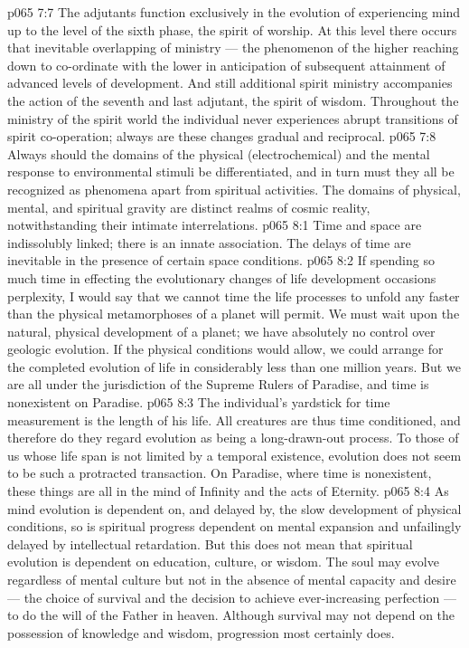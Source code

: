 \vs p065 7:7 The adjutants function exclusively in the evolution of experiencing mind up to the level of the sixth phase, the spirit of worship. At this level there occurs that inevitable overlapping of ministry --- the phenomenon of the higher reaching down to co\hyp{}ordinate with the lower in anticipation of subsequent attainment of advanced levels of development. And still additional spirit ministry accompanies the action of the seventh and last adjutant, the spirit of wisdom. Throughout the ministry of the spirit world the individual never experiences abrupt transitions of spirit co\hyp{}operation; always are these changes gradual and reciprocal.
\vs p065 7:8 Always should the domains of the physical (electrochemical) and the mental response to environmental stimuli be differentiated, and in turn must they all be recognized as phenomena apart from spiritual activities. The domains of physical, mental, and spiritual gravity are distinct realms of cosmic reality, notwithstanding their intimate interrelations.
\vs p065 8:1 Time and space are indissolubly linked; there is an innate association. The delays of time are inevitable in the presence of certain space conditions.
\vs p065 8:2 If spending so much time in effecting the evolutionary changes of life development occasions perplexity, I would say that we cannot time the life processes to unfold any faster than the physical metamorphoses of a planet will permit. We must wait upon the natural, physical development of a planet; we have absolutely no control over geologic evolution. If the physical conditions would allow, we could arrange for the completed evolution of life in considerably less than one million years. But we are all under the jurisdiction of the Supreme Rulers of Paradise, and time is nonexistent on Paradise.
\vs p065 8:3 The individual’s yardstick for time measurement is the length of his life. All creatures are thus time conditioned, and therefore do they regard evolution as being a long\hyp{}drawn\hyp{}out process. To those of us whose life span is not limited by a temporal existence, evolution does not seem to be such a protracted transaction. On Paradise, where time is nonexistent, these things are all  in the mind of Infinity and the acts of Eternity.
\vs p065 8:4 As mind evolution is dependent on, and delayed by, the slow development of physical conditions, so is spiritual progress dependent on mental expansion and unfailingly delayed by intellectual retardation. But this does not mean that spiritual evolution is dependent on education, culture, or wisdom. The soul may evolve regardless of mental culture but not in the absence of mental capacity and desire --- the choice of survival and the decision to achieve ever\hyp{}increasing perfection --- to do the will of the Father in heaven. Although survival may not depend on the possession of knowledge and wisdom, progression most certainly does.
